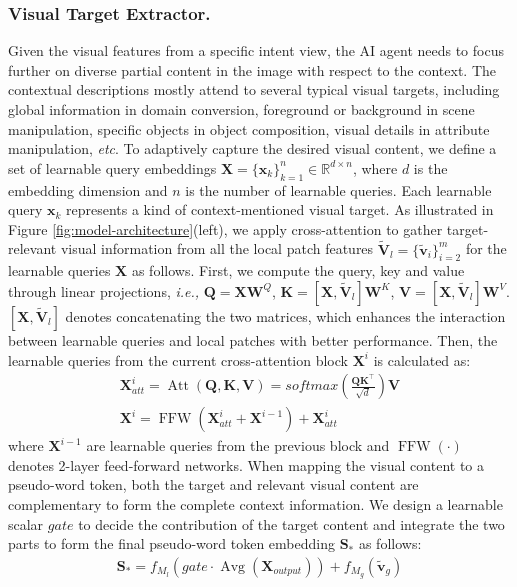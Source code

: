 \documentclass[letterpaper]{article} \usepackage{aaai24}  \usepackage{times}  \usepackage{helvet}  \usepackage{courier}  \usepackage[hyphens]{url}  \usepackage{graphicx} \urlstyle{rm} \def\UrlFont{\rm}  \usepackage{natbib}  \usepackage{caption} \frenchspacing  \setlength{\pdfpagewidth}{8.5in} \setlength{\pdfpageheight}{11in} \usepackage{algorithm}
\begin{document}
\subsubsection{Visual Target Extractor.}  Given the visual features from a specific intent view, the AI agent needs to focus further on diverse partial content in the image with respect to the context. The contextual descriptions mostly attend to several typical visual targets, including global information in domain conversion, foreground or background in scene manipulation, specific objects in object composition, visual details in attribute manipulation, \textit{etc}. To adaptively capture the desired visual content, we define a set of learnable query embeddings  $\boldsymbol{X}=\{\boldsymbol{x}_k\}_{k=1}^n\in{\mathbb{R}^{d\times{n}}}$, where $d$ is the embedding dimension and $n$ is the number of learnable queries. Each learnable query $\boldsymbol{x}_k$ represents a kind of context-mentioned visual target. As illustrated in Figure \ref{fig:model-architecture}(left), we apply cross-attention to gather target-relevant visual information from all the local patch features $\tilde{\boldsymbol{V}}_l = \{\tilde{\boldsymbol{v}}_i\}_{i=2}^m$ for the learnable queries $\boldsymbol{X}$ as follows. First, we compute the query, key and value through linear projections, \textit{i.e.,} $\boldsymbol{Q} = \boldsymbol{X}\boldsymbol{W}^Q$, $\boldsymbol{K} = [\boldsymbol{X}, \tilde{\boldsymbol{V}}_l]\boldsymbol{W}^K$, $\boldsymbol{V} = [\boldsymbol{X}, \tilde{\boldsymbol{V}}_l]\boldsymbol{W}^V$.  $[\boldsymbol{X}, \tilde{\boldsymbol{V}}_l]$ denotes concatenating the two matrices, which enhances the interaction between learnable queries and local patches with better performance. Then, the learnable queries from the current cross-attention block $\boldsymbol{X}^{i}$ is calculated as:
\begin{gather}
\boldsymbol{X}_{att}^{i} = \operatorname{Att}(\boldsymbol{Q}, \boldsymbol{K}, \boldsymbol{V})=\textit{softmax}\left(\frac{\boldsymbol{Q K}^{\top}}{\sqrt{d}}\right)\boldsymbol{V} \\
\boldsymbol{X}^{i} = \operatorname{FFW}(\boldsymbol{X}_{att}^{i} + \boldsymbol{X}^{i-1}) + \boldsymbol{X}_{att}^{i}
\label{f:attn}
\end{gather}
\noindent where $\boldsymbol{X}^{i-1}$ are learnable queries from the previous block and $\operatorname{FFW}(\cdot)$ denotes 2-layer feed-forward networks. When mapping the visual content to a pseudo-word token, both the target and relevant visual content are complementary to form the complete context information. We design a learnable scalar $gate$ to decide the contribution of the target content and integrate the two parts to form the final pseudo-word token embedding $\boldsymbol{S}_{*}$ as follows:  
\begin{gather}
\boldsymbol{S}_{*} = f_{M_l}(gate\cdot\operatorname{Avg}(\boldsymbol{X}_{output}))+ f_{M_g}(\tilde{\boldsymbol{v}}_{g})
\label{f:gate}
\end{gather}
\end{document}
